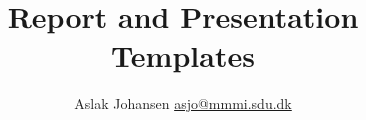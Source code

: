 \title{Report and Presentation Templates}
\author{Aslak Johansen \href{mailto:asjo@mmmi.sdu.dk}{asjo@mmmi.sdu.dk}}
